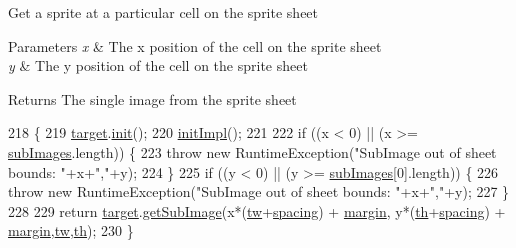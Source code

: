 Get a sprite at a particular cell on the sprite sheet


\begin{DoxyParams}{Parameters}
{\em x} & The x position of the cell on the sprite sheet \\
\hline
{\em y} & The y position of the cell on the sprite sheet \\
\hline
\end{DoxyParams}
\begin{DoxyReturn}{Returns}
The single image from the sprite sheet 
\end{DoxyReturn}

\begin{DoxyCode}
218                                          \{
219         \mbox{\hyperlink{classorg_1_1newdawn_1_1slick_1_1_sprite_sheet_a54e0b09e9140db02bc11ac22fff5d464}{target}}.\mbox{\hyperlink{classorg_1_1newdawn_1_1slick_1_1_image_a94d180c9218ba1444a0496a1898ec345}{init}}();
220         \mbox{\hyperlink{classorg_1_1newdawn_1_1slick_1_1_sprite_sheet_a66be61bdff9a452f365abe95d2b47da2}{initImpl}}();
221 
222         \textcolor{keywordflow}{if} ((x < 0) || (x >= \mbox{\hyperlink{classorg_1_1newdawn_1_1slick_1_1_sprite_sheet_a4aa6be08aecfbd439794ca984ce6e44c}{subImages}}.length)) \{
223             \textcolor{keywordflow}{throw} \textcolor{keyword}{new} RuntimeException(\textcolor{stringliteral}{"SubImage out of sheet bounds: "}+x+\textcolor{stringliteral}{","}+y);
224         \}
225         \textcolor{keywordflow}{if} ((y < 0) || (y >= \mbox{\hyperlink{classorg_1_1newdawn_1_1slick_1_1_sprite_sheet_a4aa6be08aecfbd439794ca984ce6e44c}{subImages}}[0].length)) \{
226             \textcolor{keywordflow}{throw} \textcolor{keyword}{new} RuntimeException(\textcolor{stringliteral}{"SubImage out of sheet bounds: "}+x+\textcolor{stringliteral}{","}+y);
227         \}
228 
229         \textcolor{keywordflow}{return} \mbox{\hyperlink{classorg_1_1newdawn_1_1slick_1_1_sprite_sheet_a54e0b09e9140db02bc11ac22fff5d464}{target}}.\mbox{\hyperlink{classorg_1_1newdawn_1_1slick_1_1_image_a2ccb3bbdda674f9efdec614a54e31e32}{getSubImage}}(x*(\mbox{\hyperlink{classorg_1_1newdawn_1_1slick_1_1_sprite_sheet_a98ea5eda333db800a8e0ab4251bacfdc}{tw}}+\mbox{\hyperlink{classorg_1_1newdawn_1_1slick_1_1_sprite_sheet_acfe40394e52d34270bc42e936472b5a6}{spacing}}) + 
      \mbox{\hyperlink{classorg_1_1newdawn_1_1slick_1_1_sprite_sheet_a971a0145bb69e5bf2ae0432b7f2a69f5}{margin}}, y*(\mbox{\hyperlink{classorg_1_1newdawn_1_1slick_1_1_sprite_sheet_a9bb93039202eef9a5284f5d5565b23c9}{th}}+\mbox{\hyperlink{classorg_1_1newdawn_1_1slick_1_1_sprite_sheet_acfe40394e52d34270bc42e936472b5a6}{spacing}}) + \mbox{\hyperlink{classorg_1_1newdawn_1_1slick_1_1_sprite_sheet_a971a0145bb69e5bf2ae0432b7f2a69f5}{margin}},\mbox{\hyperlink{classorg_1_1newdawn_1_1slick_1_1_sprite_sheet_a98ea5eda333db800a8e0ab4251bacfdc}{tw}},\mbox{\hyperlink{classorg_1_1newdawn_1_1slick_1_1_sprite_sheet_a9bb93039202eef9a5284f5d5565b23c9}{th}}); 
230     \}
\end{DoxyCode}
